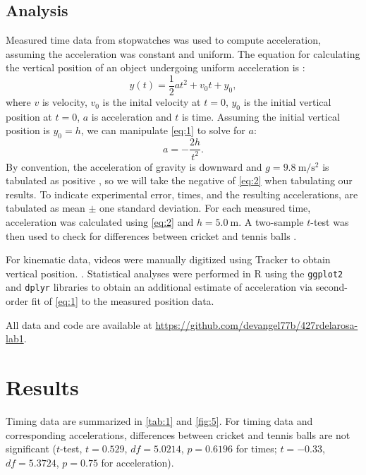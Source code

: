\documentclass[reprint,amsmath,amssymb,aps,twoside]{revtex4-2}
\begin{document}
\subsection{Analysis}
Measured time data from stopwatches was used to compute acceleration, assuming the acceleration was constant and uniform. The equation for calculating the vertical position of an object undergoing uniform acceleration is \cite{tipler,openstax,barrons}:
\begin{equation}
y(t) = \frac{1}{2} a t^2 + v_0 t + y_0,
\label{eq:1}
\end{equation}
where $v$ is velocity, $v_0$ is the inital velocity at $t=0$, $y_0$ is the initial vertical position at $t=0$, $a$ is acceleration and $t$ is time. Assuming the initial vertical position is $y_0 = h$, we can manipulate \cref{eq:1} to solve for $a$:
\begin{equation}
a = -\dfrac{2h}{t^2}.
\label{eq:2}
\end{equation}
By convention, the acceleration of gravity is downward and $g=\qty{9.8}{\meter\per\second\squared}$ is tabulated as positive \cite{tipler, openstax, barrons}, so we will take the negative of \cref{eq:2} when tabulating our results. To indicate experimental error, times, and the resulting accelerations, are tabulated as mean $\pm$ one standard deviation. For each measured time, acceleration was calculated using \cref{eq:2} and $h=\qty{5.0}{\meter}$. A two-sample $t$-test was then used to check for differences between cricket and tennis balls \cite{starnes:2015:practice, R}. 

For kinematic data, videos were manually digitized using Tracker \cite{tracker, renika:2024:kinematics} to obtain vertical position. . Statistical analyses \cite{starnes:2015:practice} were performed in R \cite{R} using the \texttt{ggplot2} and \texttt{dplyr} libraries \cite{ggplot2, dplyr} to obtain an additional estimate of acceleration via second-order fit of \cref{eq:1} to the measured position data. 

All data and code are available at \url{https://github.com/devangel77b/427rdelarosa-lab1}. 	



	

	

	
\section{Results}
Timing data are summarized in \cref{tab:1} and \cref{fig:5}. For timing data and corresponding accelerations, differences between cricket and tennis balls are not significant ($t$-test, $t=0.529$, $df=5.0214$, $p=0.6196$ for times; $t=-0.33$, $df=5.3724$, $p=0.75$ for acceleration).
\end{document}
